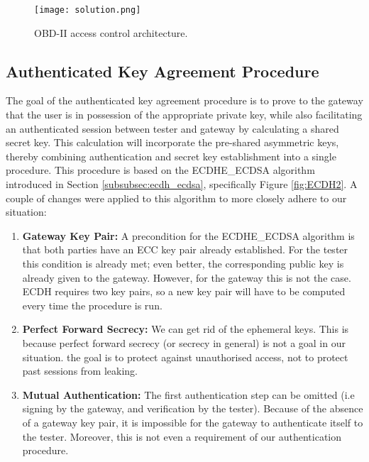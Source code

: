 \begin{figure}[h]
	\label{fig:solution}
	\centering
	\texttt{[image: solution.png]}
	\caption{OBD-II access control architecture.}
\end{figure}


\subsection{Authenticated Key Agreement Procedure}
\label{subsec:authenticated_key_agreement_procedure}

The goal of the authenticated key agreement procedure is to prove to the gateway that the user is in possession of the appropriate private key, while also facilitating an authenticated session between tester and gateway by calculating a shared secret key. This calculation will incorporate the pre-shared asymmetric keys, thereby combining authentication and secret key establishment into a single procedure. This procedure is based on the ECDHE\_ECDSA algorithm introduced in Section \ref{subsubsec:ecdh_ecdsa}, specifically Figure \ref{fig:ECDH2}. A couple of changes were applied to this algorithm to more closely adhere to our situation:
\begin{enumerate}
	\item \textbf{Gateway Key Pair:} A precondition for the ECDHE\_ECDSA algorithm is that both parties have an ECC key pair already established. For the tester this condition is already met; even better, the corresponding public key is already given to the gateway. However, for the gateway this is not the case. ECDH requires two key pairs, so a new key pair will have to be computed every time the procedure is run.
	
	\item \textbf{Perfect Forward Secrecy:} We can get rid of the ephemeral keys. This is because perfect forward secrecy (or secrecy in general) is not a goal in our situation. the goal is to protect against unauthorised access, not to protect past sessions from leaking. 
	
	\item \textbf{Mutual Authentication:} The first authentication step can be omitted (i.e signing by the gateway, and verification by the tester). Because of the absence of a gateway key pair, it is impossible for the gateway to authenticate itself to the tester. Moreover, this is not even a requirement of our authentication procedure.
\end{enumerate}
